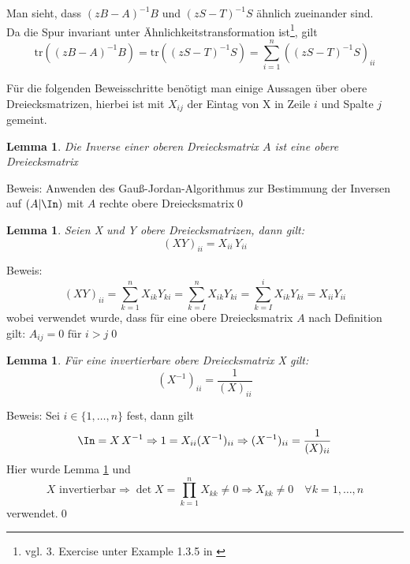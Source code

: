 \documentclass[a4paper,12pt]{report}
\newcommand{\tr}{\text{tr}}
\newcommand{\inv}{^{-1}}
\newcommand{\1}{\mathds{1}}
\theoremstyle{plain} %
\newtheorem{lemma}[theorem]{Lemma}  %
\theoremstyle{definition} %
\theoremstyle{remark}
\begin{document}
            Man sieht, dass $(zB-A)\inv B$ und  $(zS-T)\inv S$ ähnlich zueinander sind.\\
            Da die Spur invariant unter Ähnlichkeitstransformation ist\footnote{vgl. 3. Exercise unter Example 1.3.5 in \cite{matrixSpur}}, gilt
            \begin{equation}
                  \label{eqn: Haltepunkt Bew Futamura}
                  \tr((zB-A)\inv B) = \tr((zS-T)\inv S) = \sum_{i=1}^{n}((zS-T)\inv S)_{ii}
            \end{equation}

            Für die folgenden Beweisschritte benötigt man einige Aussagen über obere Dreiecksmatrizen, hierbei ist mit $X_{ij}$ der Eintag von X in Zeile $i$ und Spalte $j$ gemeint.

            \begin{lemma}
                  \label{Hilfslemma_Futamura: Inv Dreieck}
                  Die Inverse einer oberen Dreiecksmatrix $A$ ist eine obere Dreiecksmatrix
            \end{lemma}
            Beweis: Anwenden des Gauß-Jordan-Algorithmus zur Bestimmung der Inversen auf $(A|\In)$ mit $A$ rechte obere Dreiecksmatrix\qed

            \begin{lemma}
                  \label{Hilfslemma_Futamura: Prod Dreieck}
                  Seien X und Y obere Dreiecksmatrizen, dann gilt:
                  $$(XY)_{ii} = X_{ii}\, Y_{ii}$$
            \end{lemma}
            Beweis:
            $$(XY)_{ii} = \sum_{k=1}^n X_{ik}Y_{ki} = \sum_{k=I}^{n}X_{ik}Y_{ki} = \sum_{k=I}^{i}X_{ik}Y_{ki} = X_{ii} Y_{ii}$$
            wobei verwendet wurde, dass für eine obere Dreiecksmatrix $A$ nach Definition gilt:
            $A_{ij} = 0 \text{ für }i>j$\qed

            \begin{lemma}
                  \label{Hilfslemma_Futamura: Diag Inv Dreieck}
                  Für eine invertierbare obere Dreiecksmatrix X gilt:
                  $$(X\inv)_{ii} = \frac 1 {(X)_{ii}}$$
            \end{lemma}
            Beweis: Sei $i\in\{1,\dots,n\}$ fest, dann gilt
            $$\In = X\,X\inv \Rightarrow 1 = X_{ii}(X\inv)_{ii} \Rightarrow (X\inv)_{ii} = \frac 1 {(X)_{ii}}$$
            Hier wurde Lemma \ref{Hilfslemma_Futamura: Prod Dreieck} und
            $$X \text{ invertierbar}\Rightarrow \det X = \prod_{k=1}^{n}X_{kk}\ne 0\Rightarrow X_{kk}\ne 0\quad \forall k=1,\dots,n$$
            verwendet.\qed\\
\end{document}
